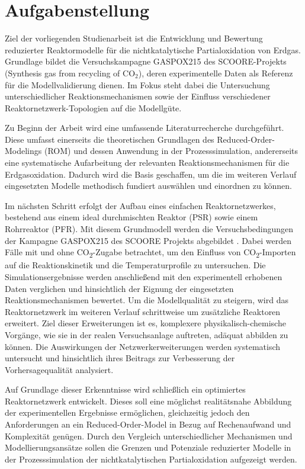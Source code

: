 \chapter*{Aufgabenstellung}

Ziel der vorliegenden Studienarbeit ist die Entwicklung und Bewertung reduzierter Reaktormodelle für die nichtkatalytische Partialoxidation von Erdgas. Grundlage bildet die Versuchskampagne GASPOX215 des SCOORE-Projekts (Synthesis gas from recycling of CO$_2$), deren experimentelle Daten als Referenz für die Modellvalidierung dienen. Im Fokus steht dabei die Untersuchung unterschiedlicher Reaktionsmechanismen sowie der Einfluss verschiedener Reaktornetzwerk-Topologien auf die Modellgüte.

Zu Beginn der Arbeit wird eine umfassende Literaturrecherche durchgeführt. Diese umfasst einerseits die theoretischen Grundlagen des Reduced-Order-Modelings (ROM) und dessen Anwendung in der Prozesssimulation, andererseits eine systematische Aufarbeitung der relevanten Reaktionsmechanismen für die Erdgasoxidation. Dadurch wird die Basis geschaffen, um die im weiteren Verlauf eingesetzten Modelle methodisch fundiert auswählen und einordnen zu können.

Im nächsten Schritt erfolgt der Aufbau eines einfachen Reaktornetzwerkes, bestehend aus einem ideal durchmischten Reaktor (PSR) sowie einem Rohrreaktor (PFR). Mit diesem Grundmodell werden die Versuchsbedingungen der Kampagne GASPOX215 des SCOORE Projekts abgebildet \cite{Scoore_Enargus}. Dabei werden Fälle mit und ohne CO\textsubscript{2}-Zugabe betrachtet, um den Einfluss von CO\textsubscript{2}-Importen auf die Reaktionskinetik und die Temperaturprofile zu untersuchen. Die Simulationsergebnisse werden anschließend mit den experimentell erhobenen Daten verglichen und hinsichtlich der Eignung der eingesetzten Reaktionsmechanismen bewertet. Um die Modellqualität zu steigern, wird das Reaktornetzwerk im weiteren Verlauf schrittweise um zusätzliche Reaktoren erweitert. Ziel dieser Erweiterungen ist es, komplexere physikalisch-chemische Vorgänge, wie sie in der realen Versuchsanlage auftreten, adäquat abbilden zu können. Die Auswirkungen der Netzwerkerweiterungen werden systematisch untersucht und hinsichtlich ihres Beitrags zur Verbesserung der Vorhersagequalität analysiert.

Auf Grundlage dieser Erkenntnisse wird schließlich ein optimiertes Reaktornetzwerk entwickelt. Dieses soll eine möglichst realitätsnahe Abbildung der experimentellen Ergebnisse ermöglichen, gleichzeitig jedoch den Anforderungen an ein Reduced-Order-Model in Bezug auf Rechenaufwand und Komplexität genügen. Durch den Vergleich unterschiedlicher Mechanismen und Modellierungsansätze sollen die Grenzen und Potenziale reduzierter Modelle in der Prozesssimulation der nichtkatalytischen Partialoxidation aufgezeigt werden.

